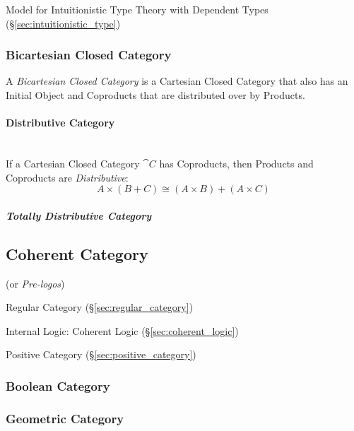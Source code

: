 Model for Intuitionistic Type Theory with Dependent Types
(\S\ref{sec:intuitionistic_type})



\subsubsection{Bicartesian Closed Category}\label{sec:bicartesian}

A \emph{Bicartesian Closed Category} is a Cartesian Closed Category
that also has an Initial Object and Coproducts that are distributed
over by Products.



\paragraph{Distributive Category}\label{sec:distributive_category}
\hfill \\

If a Cartesian Closed Category $\cat{C}$ has Coproducts, then
Products and Coproducts are \emph{Distributive}:\cite{awodey06}
\[
  A \times (B + C) \cong (A \times B) + (A \times C)
\]



\subparagraph{Totally Distributive Category}
\label{sec:totally_distributive_category}



\subsection{Coherent Category}\label{sec:coherent_category}

(or \emph{Pre-logos})

Regular Category (\S\ref{sec:regular_category})

Internal Logic: Coherent Logic (\S\ref{sec:coherent_logic})

Positive Category (\S\ref{sec:positive_category})



\subsubsection{Boolean Category}\label{sec:boolean_category}

\subsubsection{Geometric Category}\label{sec:geometric_category}

